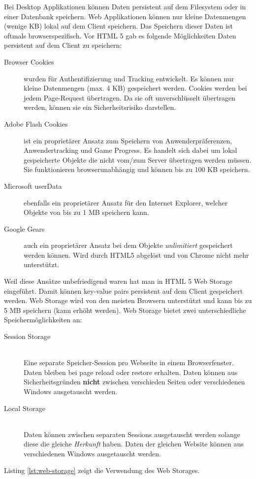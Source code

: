 Bei Desktop Applikationen können Daten persistent auf dem Filesystem oder in einer Datenbank speichern. Web Applikationen können nur kleine Datenmengen (wenige KB) lokal auf dem Client speichern. Das Speichern dieser Daten ist oftmals browserspezifisch. Vor HTML 5 gab es folgende Möglichkeiten Daten persistent auf dem Client zu speichern:
\begin{description}
	\item[Browser Cookies] wurden für Authentifizierung und Tracking entwickelt. Es können nur kleine Datenmengen (max. 4 KB) gespeichert werden. Cookies werden bei jedem Page-Request übertragen. Da sie oft unverschlüsselt übertragen werden, können sie ein Sicherheitsrisiko darstellen.
	\item[Adobe Flash Cookies] ist ein proprietärer Ansatz zum Speichern von Anwenderpräferenzen, Anwendertracking und Game Progress. Es handelt sich dabei um lokal gespeicherte Objekte die nicht vom/zum Server übertragen werden müssen. Sie funktionieren browserunabhängig und können bis zu 100 KB speichern.
	\item[Microsoft userData] ebenfalls ein proprietärer Ansatz für den Internet Explorer, welcher Objekte von bis zu 1 MB speichern kann.
	\item[Google Gears] auch ein proprietärer Ansatz bei dem Objekte \textit{unlimitiert} gespeichert werden können. Wird durch HTML5 abgelöst und von Chrome nicht mehr unterstützt.
\end{description}
Weil diese Ansätze unbefriedigend waren hat man in HTML 5 Web Storage eingeführt. Damit können key-value pairs persistent auf dem Client gespeichert werden. Web Storage wird von den meisten Browsern unterstützt und kann bis zu 5 MB speichern (kann erhöht werden). Web Storage bietet zwei unterschiedliche Speichermöglichkeiten an:
\begin{description}
	\item[Session Storage] \hfil \\
	 Eine separate Speicher-Session pro Webseite in einem Browserfenster. Daten bleiben bei page reload oder restore erhalten. Daten können aus Sicherheitsgründen \textbf{nicht} zwischen verschieden Seiten oder verschiedenen Windows ausgetauscht werden.
 	\item[Local Storage] \hfil \\
 	Daten können zwischen separaten Sessions ausgetauscht werden solange diese die gleiche \textit{Herkunft} haben. Daten der gleichen Website können aus verschiedenen Windows ausgetauscht werden.
\end{description}
Listing \ref{lst:web-storage} zeigt die Verwendung des Web Storages.

